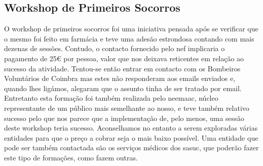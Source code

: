 
\subsection{Workshop de Primeiros Socorros}

O workshop de primeiros socorros foi uma iniciativa pensada após se verificar que o mesmo foi feito em farmácia e teve uma adesão estrondosa contando com mais dezenas de sessões. Contudo, o contacto fornecido pelo \acrshort{nef} implicaria o pagamento de 25€ por pessoa, valor que nos deixava reticentes em relação ao sucesso da atividade. Tentou-se então entrar em contacto com os Bombeiros Voluntários de Coimbra mas estes não responderam aos emails enviados e, quando lhes ligámos, alegaram que o assunto tinha de ser tratado por email. Entretanto esta formação foi também realizada pelo \acrshort{neemaac}, núcleo representante de um público mais semelhante ao nosso, e teve também relativo sucesso pelo que nos parece que a implementação de, pelo menos, uma sessão deste workshop teria sucesso. Aconselhamos no entanto a serem exploradas várias entidades para que o preço a cobrar seja o mais baixo possível. Uma entidade que pode ser também contactada são os serviços médicos dos \acrshort{sasuc}, que poderão fazer este tipo de formações, como fazem outras.